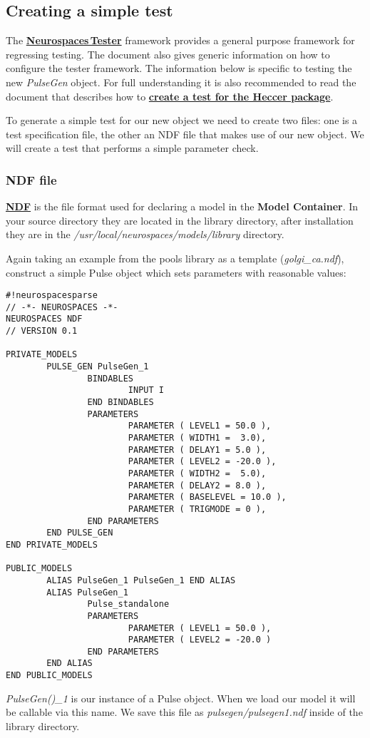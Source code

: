 \documentclass[12pt]{article}
\begin{document}
\subsection*{Creating a simple test}

The \href{../neurospaces-tester/neurospaces-tester.tex}{\bf Neurospaces\,Tester} framework provides a general purpose framework for
regressing testing.  The document also gives generic
information on how to configure the tester framework.  The information
below is specific to testing the new {\it PulseGen} object.  For full
understanding it is also recommended to read the document that
describes how to
\href{../genesis-create-test-heccer/genesis-create-test-heccer.tex}{\bf create a test for the Heccer package}.

To generate a simple test for our new object we need to create two
files: one is a test specification file, the other an NDF file that
makes use of our new object. We will create a test that performs a
simple parameter check.

\subsubsection*{NDF file}

\href{../ndf-file-format/ndf-file-format.tex}{\bf NDF} is the file format used for declaring a model in the {\bf Model Container}. In your source directory they are located in the library directory, after installation they are in the {\it /usr/local/neurospaces/models/library} directory.

Again taking an example from the pools library as a template ({\it golgi\_ca.ndf}), construct a simple Pulse object which sets parameters with reasonable values:
\begin{verbatim}
#!neurospacesparse
// -*- NEUROSPACES -*-
NEUROSPACES NDF
// VERSION 0.1

PRIVATE_MODELS
        PULSE_GEN PulseGen_1
                BINDABLES
                        INPUT I
                END BINDABLES
                PARAMETERS
                        PARAMETER ( LEVEL1 = 50.0 ),
                        PARAMETER ( WIDTH1 =  3.0),
                        PARAMETER ( DELAY1 = 5.0 ),
                        PARAMETER ( LEVEL2 = -20.0 ),
                        PARAMETER ( WIDTH2 =  5.0),
                        PARAMETER ( DELAY2 = 8.0 ),
                        PARAMETER ( BASELEVEL = 10.0 ),
                        PARAMETER ( TRIGMODE = 0 ),
                END PARAMETERS
        END PULSE_GEN
END PRIVATE_MODELS

PUBLIC_MODELS
        ALIAS PulseGen_1 PulseGen_1 END ALIAS
        ALIAS PulseGen_1 
                Pulse_standalone
                PARAMETERS
                        PARAMETER ( LEVEL1 = 50.0 ),
                        PARAMETER ( LEVEL2 = -20.0 )
                END PARAMETERS
        END ALIAS
END PUBLIC_MODELS
\end{verbatim}
{\it PulseGen()\_1} is our instance of a Pulse object. When we load our model it will be callable via this name. We save this file as {\it pulsegen/pulsegen1.ndf} inside of the library directory.
\end{document}
